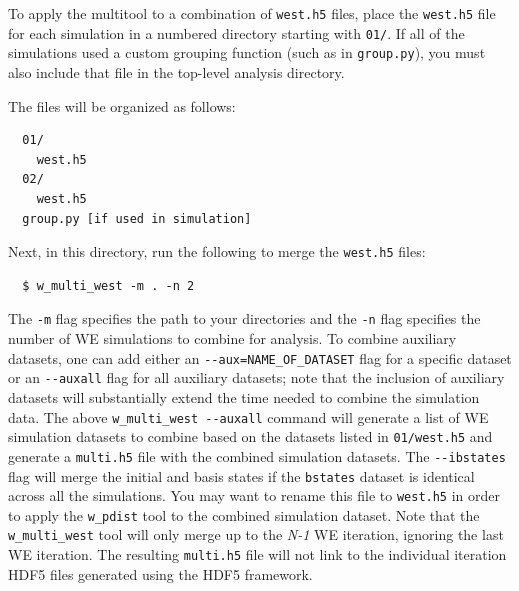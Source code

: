 To apply the multitool to a combination of \verb|west.h5| files, place the \verb|west.h5| file for each simulation in a numbered directory starting with \verb|01/|. 
If all of the simulations used a custom grouping function (such as in \verb|group.py|), you must also include that file in the top-level analysis directory. 

\noindent The files will be organized as follows:
\begin{verbatim}
  01/
    west.h5
  02/
    west.h5
  group.py [if used in simulation]
\end{verbatim}

Next, in this directory, run the following to merge the \verb|west.h5| files:
\begin{verbatim}
  $ w_multi_west -m . -n 2
\end{verbatim}

The \verb|-m| flag specifies the path to your directories and the \verb|-n| flag specifies the number of WE simulations to combine for analysis. 
To combine auxiliary datasets, one can add either an \verb|--aux=NAME_OF_DATASET| flag for a specific dataset or an \verb|--auxall| flag for all auxiliary datasets; note that the inclusion of auxiliary datasets will substantially extend the time needed to combine the simulation data. 
The above \verb|w_multi_west --auxall| command will generate a list of WE simulation datasets to combine based on the datasets listed in \verb|01/west.h5| and generate a \verb|multi.h5| file with the combined simulation datasets. 
The \verb|--ibstates| flag will merge the initial and basis states if the \verb|bstates| dataset is identical across all the simulations.
You may want to rename this file to \verb|west.h5| in order to apply the \verb|w_pdist| tool to the combined simulation dataset. 
Note that the \verb|w_multi_west| tool will only merge up to the \textit{N-1} WE iteration, ignoring the last WE iteration. 
The resulting \verb|multi.h5| file will not link to the individual iteration HDF5 files generated using the HDF5 framework.

